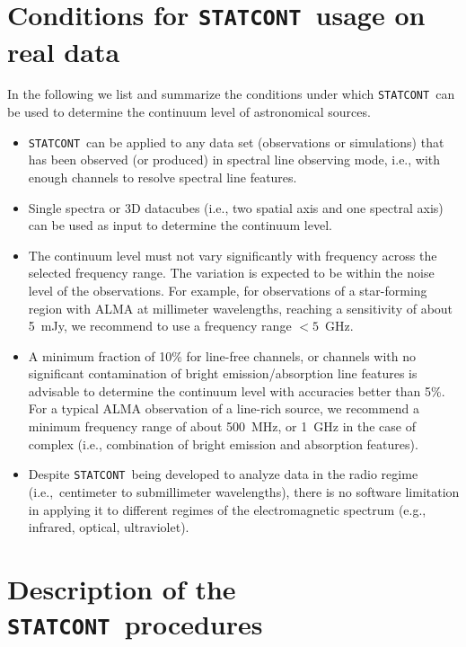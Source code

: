 \documentclass{aa}
\newcommand{\statcont} {\texttt{STATCONT}}
\begin{document}
\section{Conditions for \statcont\ usage on real data}\label{s:conditions}

In the following we list and summarize the conditions under which \statcont\ can be used to determine the continuum level of astronomical sources.
%
\begin{itemize}
\item \statcont\ can be applied to any data set (observations or simulations) that has been observed (or produced) in spectral line observing mode, i.e., with enough channels to resolve spectral line features.
%
\item Single spectra or 3D datacubes (i.e., two spatial axis and one spectral axis) can be used as input to determine the continuum level.
%
\item The continuum level must not vary significantly with frequency across the selected frequency range. The variation is expected to be within the noise level of the observations. For example, for observations of a star-forming region with ALMA at millimeter wavelengths, reaching a sensitivity of about 5~mJy, we recommend to use a frequency range $<5$~GHz.
%
\item A minimum fraction of 10\% for line-free channels, or channels with no significant contamination of bright emission/absorption line features is advisable to determine the continuum level with accuracies better than 5\%. For a typical ALMA observation of a line-rich source, we recommend a minimum frequency range of about 500~MHz, or 1~GHz in the case of complex (i.e., combination of bright emission and absorption features).
%
\item Despite \statcont\ being developed to analyze data in the radio regime (i.e.,\ centimeter to submillimeter wavelengths), there is no software limitation in applying it to different regimes of the electromagnetic spectrum (e.g., infrared, optical, ultraviolet).
\end{itemize}



\section{Description of the \statcont\ procedures}\label{s:procedures}
\end{document}
